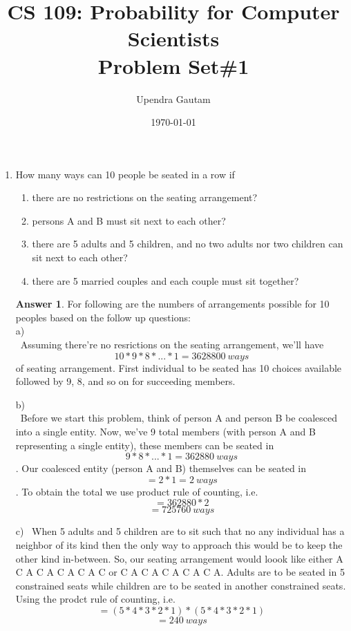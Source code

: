 \documentclass[12pt]{article}
\title{CS 109: Probability for Computer Scientists\\Problem Set\#1}
\author{Upendra Gautam} %
\date{\today} %
\renewcommand{\(}{\left(}
\renewcommand{\)}{\right)}
\theoremstyle{definition}
\newtheorem*{answer}{Answer}
\begin{document}
\maketitle
  
\begin{enumerate}
\item How many ways can 10 people be seated in a row if
    \begin{enumerate}[label=\alph*.]

    \item there are no restrictions on the seating arrangement?
    \item persons A and B must sit next to each other?
    \item there are 5 adults and 5 children, and no two adults nor two children can sit next to each other?
    \item there are 5 married couples and each couple must sit together?

    \end{enumerate}

    \begin{shaded}
    \begin{answer}
        For following are the numbers of arrangements possible for 10 peoples based on the follow up questions: \\
        a) \\
        \ Assuming there're no resrictions on the seating arrangement, we'll have \[10 * 9 * 8 * ... * 1 = 3628800 \ ways\] of seating arrangement.
        First individual to be seated has 10 choices available followed by 9, 8, and so on for succeeding members.
      
        b) \\
        \ Before we start this problem, think of person A and person B be coalesced into a single entity. Now, we've 9 total members (with person
        A and B representing a single entity), these members can be seated in \[9 * 8 * ... * 1 = 362880 \ ways\]. Our coalesced entity (person A and B)
        themselves can be seated in \[ = 2 * 1 = 2 \ ways\]. To obtain the total we use product rule of counting, i.e.
        \[= 362880 * 2 \] \[= 725760 \ ways\]
        
        c)
        \ When 5 adults and 5 children are to sit such that no any individual has a neighbor of its kind then the only way to approach this
        would be to keep the other kind in-between. So, our seating arrangement would loook like either A C A C A C A C A C or C A C A C A C A C A.
        Adults are to be seated in 5 constrained seats while children are to be seated in another constrained seats. Using the prodct rule of counting, i.e.
        \[= (5 * 4 * 3 * 2 * 1) * (5 * 4 * 3 * 2 * 1) \] \[= 240 \ ways\]


\end{answer}
\end{shaded}
\end{enumerate}
\end{document}

